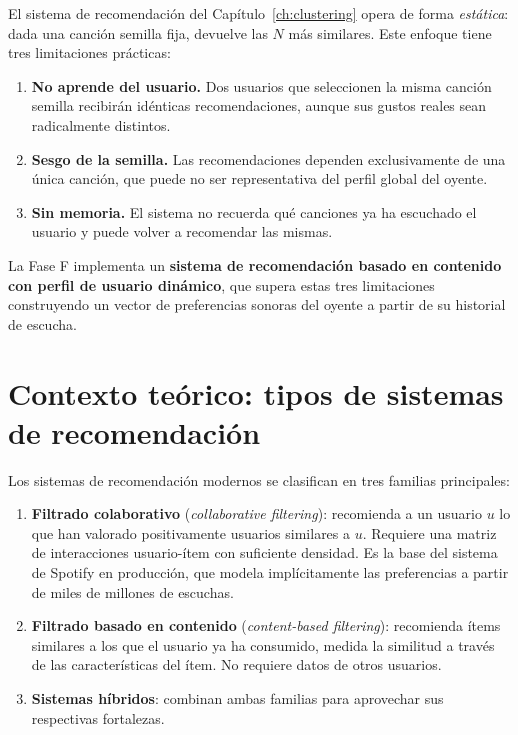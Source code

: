 \documentclass[12pt, a4paper]{book}
\theoremstyle{definition}
\begin{document}
El sistema de recomendación del Capítulo~\ref{ch:clustering} opera de forma
\textit{estática}: dada una canción semilla fija, devuelve las $N$ más
similares. Este enfoque tiene tres limitaciones prácticas:

\begin{enumerate}
  \item \textbf{No aprende del usuario.} Dos usuarios que seleccionen la
        misma canción semilla recibirán idénticas recomendaciones, aunque
        sus gustos reales sean radicalmente distintos.
  \item \textbf{Sesgo de la semilla.} Las recomendaciones dependen
        exclusivamente de una única canción, que puede no ser representativa
        del perfil global del oyente.
  \item \textbf{Sin memoria.} El sistema no recuerda qué canciones ya ha
        escuchado el usuario y puede volver a recomendar las mismas.
\end{enumerate}

La Fase F implementa un \textbf{sistema de recomendación basado en contenido
con perfil de usuario dinámico}, que supera estas tres limitaciones
construyendo un vector de preferencias sonoras del oyente a partir de su
historial de escucha.

\section{Contexto teórico: tipos de sistemas de recomendación}
\label{sec:teoria_rec}

Los sistemas de recomendación modernos se clasifican en tres familias
principales:

\begin{enumerate}
  \item \textbf{Filtrado colaborativo} (\textit{collaborative filtering}):
        recomienda a un usuario $u$ lo que han valorado positivamente
        usuarios similares a $u$. Requiere una matriz de interacciones
        usuario-ítem con suficiente densidad. Es la base del sistema de
        Spotify en producción, que modela implícitamente las preferencias
        a partir de miles de millones de escuchas.

  \item \textbf{Filtrado basado en contenido} (\textit{content-based
        filtering}): recomienda ítems similares a los que el usuario ya ha
        consumido, medida la similitud a través de las características del
        ítem. No requiere datos de otros usuarios.

  \item \textbf{Sistemas híbridos}: combinan ambas familias para aprovechar
        sus respectivas fortalezas.
\end{enumerate}
\end{document}
